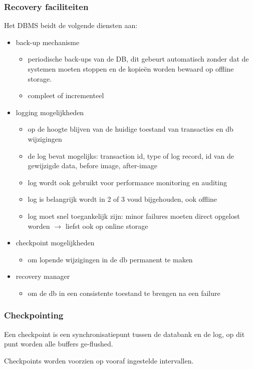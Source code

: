\documentclass[a4paper,12pt]{article}
\begin{document}
\subsubsection{Recovery faciliteiten}
Het DBMS beidt de volgende diensten aan:
\begin{itemize}
\item back-up mechanisme
	\begin{itemize}
	\item periodische back-ups van de DB, dit gebeurt automatisch zonder dat de systemen moeten stoppen en de kopieën worden bewaard op offline storage.
	\item compleet of incrementeel
	\end{itemize}
\item logging mogelijkheden
	\begin{itemize}
	\item op de hoogte blijven van de huidige toestand van transacties 	en db wijzigingen
	\item de log bevat mogelijks: transaction id, type of log record, id van de gewijzigde data, before image, after-image
	\item log wordt ook gebruikt voor performance monitoring en auditing
	\item log is belangrijk wordt in 2 of 3 voud bijgehouden, ook offline
	\item log moet snel toegankelijk zijn: minor failures moeten direct opgelost worden $\rightarrow$ liefst ook op online storage
	\end{itemize}
\item checkpoint mogelijkheden
	\begin{itemize}
	\item om lopende wijzigingen in de db permanent te maken
	\end{itemize}
\item recovery manager
	\begin{itemize}
	\item om de db in een consistente toestand te brengen na een failure
	\end{itemize}
\end{itemize}

\subsubsection{Checkpointing}
Een checkpoint is een synchronisatiepunt tussen de databank en de log,
op dit punt worden alle buffers ge-flushed.

Checkpoints worden voorzien op vooraf ingestelde intervallen.
\end{document}

